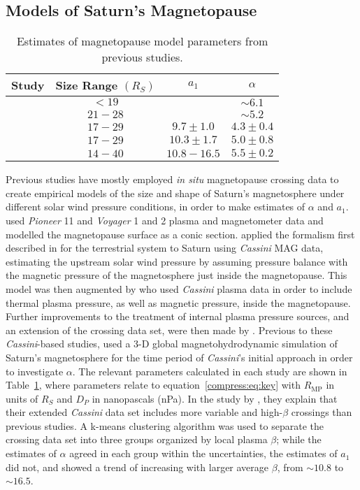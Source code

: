\subsection{Models of Saturn's Magnetopause}\label{compress:sec:prevstudies}
\begin{table}
\caption[Estimates of magnetopause model parameters from previous studies.]{Estimates of magnetopause model parameters from previous studies.}\label{compress:table:prevstudies}
\centering
\begin{tabular}{c c c c}
\hline
Study & Size Range $(\si{R_S})$ & $a_1$ & $\alpha$   \\
\hline
{\citet{slavin1985}} & $< 19$ &  & $\sim 6.1$ \\
{\citet{hansen2005}}   & $21 - 28 $ &  & $\sim 5.2$ \\
{\citet{arridge2006}} & $17-29$ & $9.7 \pm 1.0 $ & $4.3 \pm 0.4$   \\
{\citet{kanani2010}} & $17-29$ & $10.3 \pm 1.7 $ & $5.0 \pm 0.8$ \\
{\citet{pilkington2015}} & $14 - 40$ & $10.8 - 16.5$ & $5.5 \pm 0.2$ \\
\hline
\end{tabular}
\end{table}
Previous studies have mostly employed \textit{in situ} magnetopause crossing data to create empirical models of the size and shape of Saturn's magnetosphere under different solar wind pressure conditions, in order to make estimates of $\alpha$ and $a_1$. \citet{slavin1985} used \textit{Pioneer} 11 and \textit{Voyager} 1 and 2 plasma and magnetometer data and modelled the magnetopause surface as a conic section. \citet{arridge2006} applied the formalism first described in \citet{shue1997} for the terrestrial system to Saturn using \textit{Cassini} MAG data, estimating the upstream solar wind pressure by assuming pressure balance with the magnetic pressure of the magnetosphere just inside the magnetopause. This model was then augmented by \citet{kanani2010} who used \textit{Cassini} plasma data in order to include thermal plasma pressure, as well as magnetic pressure, inside the magnetopause. Further improvements to the treatment of internal plasma pressure sources, and an extension of the crossing data set, were then made by \citet{pilkington2015}. Previous to these \textit{Cassini}-based studies, \citet{hansen2005} used a 3-D global magnetohydrodynamic simulation of Saturn's magnetosphere for the time period of \textit{Cassini}'s initial approach in order to investigate $\alpha$. The relevant parameters calculated in each study are shown in Table~\ref{compress:table:prevstudies}, where parameters relate to equation~\ref{compress:eq:key} with $R_\mathrm{MP}$ in units of $\si{R_S}$ and $D_{P}$ in nanopascals (\si{nPa}). In the study by \citet{pilkington2015}, they explain that their extended \textit{Cassini} data set includes more variable and high-$\beta$ crossings than previous studies. A k-means clustering algorithm was used to separate the crossing data set into three groups organized by local plasma $\beta$; while the estimates of $\alpha$ agreed in each group within the uncertainties, the estimates of $a_1$ did not, and showed a trend of increasing with larger average $\beta$, from ${\sim}10.8$ to ${\sim}16.5$.

